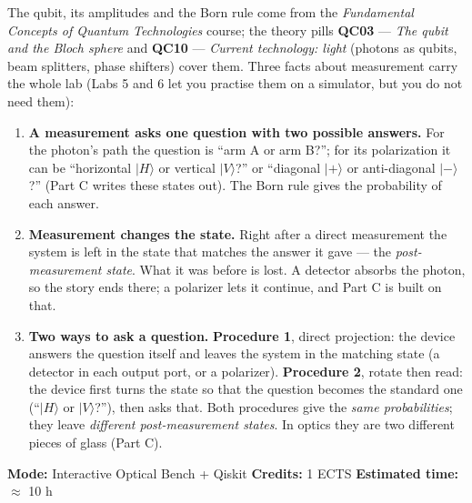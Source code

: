 \documentclass[a4paper,11pt]{article}
\providecommand{\ket}[1]{|#1\rangle}
\begin{document}
\begin{factsbox}
The qubit, its amplitudes and the Born rule come from the \textit{Fundamental Concepts
of Quantum Technologies} course; the theory pills \textbf{QC03} --- \textit{The qubit
and the Bloch sphere} and \textbf{QC10} --- \textit{Current technology: light}
(photons as qubits, beam splitters, phase shifters) cover them. Three facts about
measurement carry the whole lab (Labs 5 and 6 let you practise them on a simulator,
but you do not need them):
\begin{enumerate}
    \item \textbf{A measurement asks one question with two possible answers.} For the
          photon's path the question is ``arm A or arm B?''; for its polarization it can
          be ``horizontal $\ket{H}$ or vertical $\ket{V}$?'' or ``diagonal $\ket{+}$ or
          anti-diagonal $\ket{-}$?'' (Part C writes these states out). The Born rule
          gives the probability of each answer.
    \item \textbf{Measurement changes the state.} Right after a direct measurement the
          system is left in the state that matches the answer it gave --- the
          \emph{post-measurement state}. What it was before is lost. A detector absorbs
          the photon, so the story ends there; a polarizer lets it continue, and Part C
          is built on that.
    \item \textbf{Two ways to ask a question.} \textbf{Procedure 1}, direct projection:
          the device answers the question itself and leaves the system in the matching
          state (a detector in each output port, or a polarizer). \textbf{Procedure 2},
          rotate then read: the device first turns the state so that the question
          becomes the standard one (``$\ket{H}$ or $\ket{V}$?''), then asks that. Both
          procedures give the \emph{same probabilities}; they leave \emph{different
          post-measurement states}. In optics they are two different pieces of glass
          (Part C).
\end{enumerate}
\end{factsbox}

\noindent\textbf{Mode:} Interactive Optical Bench + Qiskit \quad\textbf{Credits:} 1 ECTS
\quad\textbf{Estimated time:} $\approx$ 10 h
\end{document}
